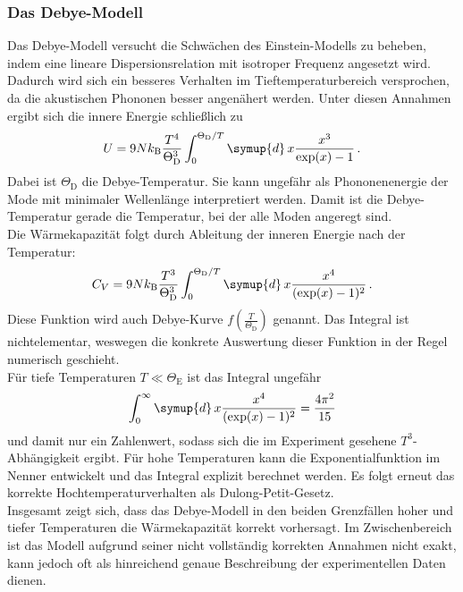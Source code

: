 \subsubsection{Das Debye-Modell}
Das Debye-Modell versucht die Schwächen des Einstein-Modells zu beheben, indem eine lineare Dispersionsrelation mit isotroper Frequenz angesetzt wird. Dadurch wird sich ein besseres Verhalten im Tieftemperaturbereich versprochen, da die akustischen Phononen besser angenähert werden.
Unter diesen Annahmen ergibt sich die innere Energie schließlich zu
\begin{equation}
  U = 9 N k_\text{B} \frac{T^4}{\Theta_\text{D}^3}\int_0^{\Theta_\text{D}/T} \symup{d}\,x \frac{x^3}{\exp(x)-1}\,.
  \label{eqn:uDebye}
\end{equation}
Dabei ist $\Theta_\text{D}$ die Debye-Temperatur. Sie kann ungefähr als Phononenenergie der Mode mit minimaler Wellenlänge interpretiert werden. Damit ist die Debye-Temperatur gerade die Temperatur, bei der alle Moden angeregt sind.\\
Die Wärmekapazität folgt durch Ableitung der inneren Energie nach der Temperatur:
\begin{equation}
  C_V = 9 N k_\text{B} \frac{T^3}{\Theta_\text{D}^3}\int_0^{\Theta_\text{D}/T} \symup{d}\,x \frac{x^4}{(\exp(x)-1)^2}\,.
  \label{eqn:cVDebye}
\end{equation}
Diese Funktion wird auch Debye-Kurve $f\left(\frac{T}{\Theta_\text{D}}\right)$ genannt.
Das Integral ist nichtelementar, weswegen die konkrete Auswertung dieser Funktion in der Regel numerisch geschieht. \\
Für tiefe Temperaturen $T \ll \Theta_\text{E}$ ist das Integral ungefähr
\begin{equation}
  \int_0^{\infty} \symup{d}\,x \frac{x^4}{(\exp(x)-1)^2} = \frac{4\pi^2}{15}
  \label{eqn:theorieIntegral}
\end{equation}
und damit nur ein Zahlenwert, sodass sich die im Experiment gesehene $T^3$-Abhängigkeit ergibt. Für hohe Temperaturen kann die Exponentialfunktion im Nenner entwickelt und das Integral explizit berechnet werden. Es folgt erneut das korrekte Hochtemperaturverhalten als Dulong-Petit-Gesetz.\\
Insgesamt zeigt sich, dass das Debye-Modell in den beiden Grenzfällen hoher und tiefer Temperaturen die Wärmekapazität korrekt vorhersagt. Im Zwischenbereich ist das Modell aufgrund seiner nicht vollständig korrekten Annahmen nicht exakt, kann jedoch oft als hinreichend genaue Beschreibung der experimentellen Daten dienen.
